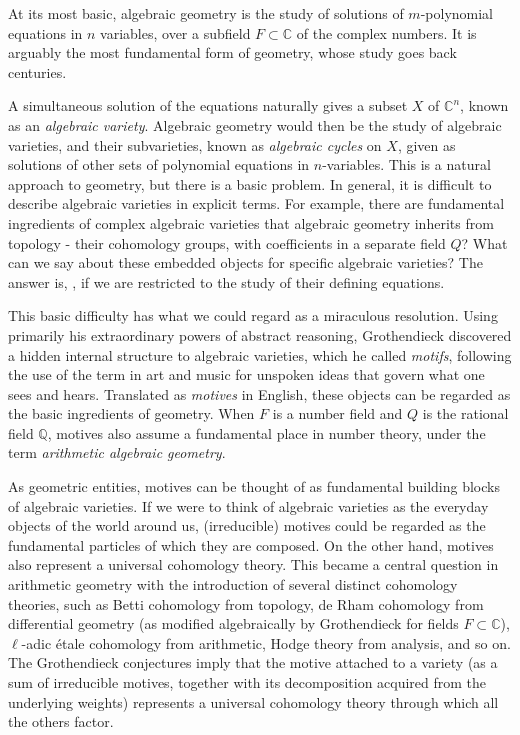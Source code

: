 \documentclass[preprint,12pt, leqno]{elsarticle}
\newcommand{\mQ}{\mathbb{Q}}
\newcommand{\mC}{\mathbb{C}}
\newcommand{\ubf}[1]{\textit{#1}}
\numberwithin{equation}{section}
\theoremstyle{named}
\begin{document}
At its most basic, algebraic geometry is the study of solutions of $m$-polynomial equations in $n$ variables, over a subfield $F\subset\mC$ of the complex numbers. It is arguably the most fundamental form of geometry, whose study goes back centuries.

A simultaneous solution of the equations naturally gives a subset $X$ of $\mC^n$, known as an \ubf{algebraic variety}. Algebraic geometry would then be the study of algebraic varieties, and their subvarieties, known as \ubf{algebraic cycles} on $X$, given as solutions of other sets of polynomial equations in $n$-variables. This is a natural approach to geometry, but there is a basic problem. In general, it is difficult to describe algebraic varieties in explicit terms. For example, there are fundamental ingredients of complex algebraic varieties that algebraic geometry inherits from topology - their cohomology groups, with coefficients in a separate field $Q$? What can we say about these embedded objects for specific algebraic varieties? The answer is, , if we are restricted to the study of their defining equations.

This basic difficulty has what we could regard as a miraculous resolution. Using primarily his extraordinary powers of abstract reasoning, Grothendieck discovered a hidden internal structure to algebraic varieties, which he called \ubf{motifs}, following the use of the term in art and music for unspoken ideas that govern what one sees and hears. Translated as \ubf{motives} in English, these objects can be regarded as the basic ingredients of geometry. When $F$ is a number field and $Q$ is the rational field $\mQ$, motives also assume a fundamental place in number theory, under the term \ubf{arithmetic algebraic geometry}.

As geometric entities, motives can be thought of as fundamental building blocks of algebraic varieties. If we were to think of algebraic varieties as the everyday objects of the world around us, (irreducible) motives could be regarded as the fundamental particles of which they are composed. On the other hand, motives also represent a universal cohomology theory. This became a central question in arithmetic geometry with the introduction of several distinct cohomology theories, such as Betti cohomology from topology, de Rham cohomology from differential geometry (as modified algebraically by Grothendieck for fields $F\subset\mC$), $\ell$-adic \'etale cohomology from arithmetic, Hodge theory from analysis, and so on. The Grothendieck conjectures imply that the motive attached to a variety (as a sum of irreducible motives, together with its decomposition acquired from the underlying weights) represents a universal cohomology theory through which all the others factor.
\end{document}
